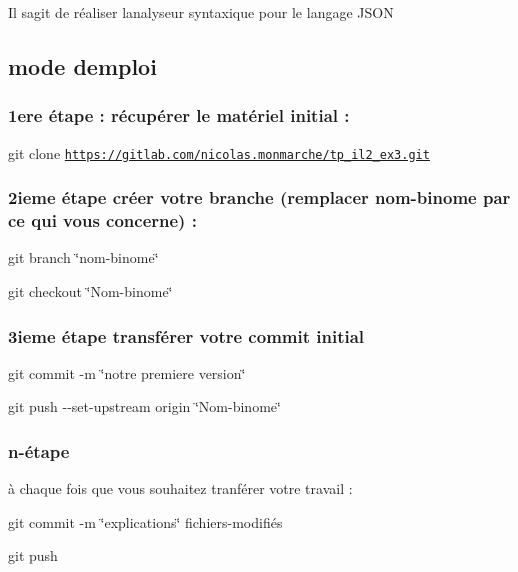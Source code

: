 Il s\textquotesingle{}agit de réaliser l\textquotesingle{}analyseur syntaxique pour le langage J\+S\+ON

\subsection*{mode d\textquotesingle{}emploi}

\subsubsection*{1ere étape \+: récupérer le matériel initial \+:}

{\ttfamily git clone \href{https://gitlab.com/nicolas.monmarche/tp_il2_ex3.git}{\tt https\+://gitlab.\+com/nicolas.\+monmarche/tp\+\_\+il2\+\_\+ex3.\+git}}

\subsubsection*{2ieme étape créer votre branche (remplacer nom-\/binome par ce qui vous concerne) \+:}

{\ttfamily git branch \char`\"{}nom-\/binome\char`\"{}}

{\ttfamily git checkout \char`\"{}\+Nom-\/binome\char`\"{}}

\subsubsection*{3ieme étape transférer votre commit initial}

{\ttfamily git commit -\/m \char`\"{}notre premiere version\char`\"{}}

{\ttfamily git push -\/-\/set-\/upstream origin \char`\"{}\+Nom-\/binome\char`\"{}}

\subsubsection*{n-\/étape}

à chaque fois que vous souhaitez tranférer votre travail \+:

{\ttfamily git commit -\/m \char`\"{}explications\char`\"{} fichiers-\/modifiés}

{\ttfamily git push} 